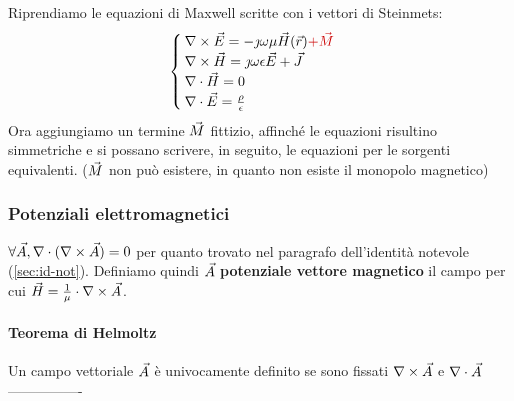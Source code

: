 Riprendiamo le equazioni di Maxwell scritte con i vettori di Steinmets:
\begin{equation}\label{eq:maxw-ant}\begin{cases}
  \rot\E = -\jmath \omega \mu\H(\r) \textcolor[rgb]{0.8,0,0}{+ \M} \\
  \rot\H = \jmath  \omega \epsilon \E + \J\\
  \diverg\H=0\\
  \diverg \E = \frac{\rho}{\epsilon}
\end{cases}\end{equation}
Ora aggiungiamo un termine $\vec{M}$ fittizio, affinché le equazioni risultino simmetriche e si possano scrivere, in seguito, le equazioni per le sorgenti equivalenti. ($\vec{M}$ non può esistere, in quanto non esiste il monopolo magnetico)

\subsubsection{Potenziali elettromagnetici}
$\forall \vec{A} , \nabla\cdot(\nabla\times \vec{A}) = 0$ per quanto trovato nel paragrafo dell'identità notevole (\ref{sec:id-not}). Definiamo quindi $\vec{A}$  \textbf{potenziale vettore magnetico} il campo per cui $\vec{H} = \frac{1}{\mu} \cdot \nabla\times \vec{A}$.
\paragraph{Teorema di Helmoltz}
Un campo vettoriale $\vec{A}$ è univocamente definito se sono fissati $\nabla\times \vec{A}$ e $\nabla\cdot \vec{A}$
----------------

